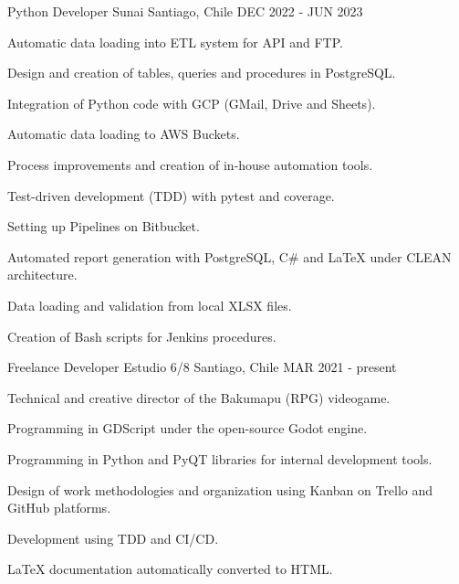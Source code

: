 

\begin{cventries}
	
\cventry
{Python Developer} %
{Sunai} %
{Santiago, Chile} %
{DEC 2022 - JUN 2023} %
{
	\begin{cvitems} %
		\item {Automatic data loading into ETL system for API and FTP.}
		\item {Design and creation of tables, queries and procedures in PostgreSQL.}
		\item {Integration of Python code with GCP (GMail, Drive and Sheets).}
		\item {Automatic data loading to AWS Buckets.}
		\item {Process improvements and creation of in-house automation tools.}
        \item {Test-driven development (TDD) with pytest and coverage.}
		\item {Setting up Pipelines on Bitbucket.}
		\item {Automated report generation with PostgreSQL, C\# and LaTeX under CLEAN architecture.}
        \item {Data loading and validation from local XLSX files.}
		\item {Creation of Bash scripts for Jenkins procedures.}
	\end{cvitems}
}

  \cventry
    {Freelance Developer} %
    {Estudio 6/8} %
    {Santiago, Chile} %
    {MAR 2021 - present} %
    {
      \begin{cvitems} %
        \item {Technical and creative director of the Bakumapu (RPG) videogame.}
        \item {Programming in GDScript under the open-source Godot engine.}
        \item {Programming in Python and PyQT libraries for internal development tools.}
        \item {Design of work methodologies and organization using Kanban on Trello and GitHub platforms.}
        \item {Development using TDD and CI/CD.}
        \item {LaTeX documentation automatically converted to HTML.} 
      \end{cvitems}
    }


\end{cventries}
